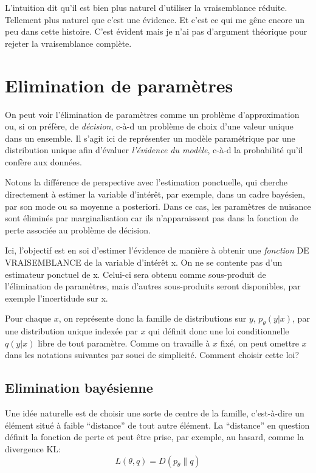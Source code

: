 \documentclass{article}
\begin{document}
L'intuition dit qu'il est bien plus naturel d'utiliser la vraisemblance r\'eduite. Tellement plus naturel que c'est une \'evidence. Et c'est ce qui me g\^ene encore un peu dans cette histoire. C'est \'evident mais je n'ai pas d'argument th\'eorique pour rejeter la vraisemblance compl\`ete. 


\section{Elimination de param\`etres}

On peut voir l'\'elimination de param\`etres comme un probl\`eme d'approximation ou, si on pr\'ef\`ere, de {\em d\'ecision}, c-\`a-d un probl\`eme de choix d'une valeur unique dans un ensemble. Il s'agit ici de repr\'esenter un mod\`ele param\'etrique par une distribution unique afin d'\'evaluer {\em l'\'evidence du mod\`ele}, c-\`a-d la probabilit\'e qu'il conf\`ere aux donn\'ees. 

Notons la diff\'erence de perspective avec l'estimation ponctuelle, qui cherche directement \`a estimer la variable d'int\'er\^et, par exemple, dans un cadre bay\'esien, par son mode ou sa moyenne a posteriori. Dans ce cas, les param\`etres de nuisance sont \'elimin\'es par marginalisation car ils n'apparaissent pas dans la fonction de perte associ\'ee au probl\`eme de d\'ecision. 

Ici, l'objectif est en soi d'estimer l'\'evidence de mani\`ere \`a obtenir une {\em fonction} DE VRAISEMBLANCE de la variable d'int\'er\^et x. On ne se contente pas d'un estimateur ponctuel de x. Celui-ci sera obtenu comme sous-produit de l'\'elimination de param\`etres, mais d'autres sous-produits seront disponibles, par exemple l'incertidude sur x. 

Pour chaque $x$, on repr\'esente donc la famille de distributions sur $y$, $p_\theta(y|x)$, par une distribution unique index\'ee par $x$ qui d\'efinit donc une loi conditionnelle $q(y|x)$ libre de tout param\`etre. Comme on travaille \`a $x$ fix\'e, on peut omettre $x$ dans les notations suivantes par souci de simplicit\'e. Comment choisir cette loi?


\subsection{Elimination bay\'esienne}

Une id\'ee naturelle est de choisir une sorte de centre de la famille, c'est-\`a-dire un \'el\'ement situ\'e \`a faible ``distance'' de tout autre \'el\'ement. La ``distance'' en question d\'efinit la fonction de perte et peut \^etre prise, par exemple, au hasard, comme la divergence KL: 
$$L(\theta, q) = D(p_\theta\|q)$$
\end{document}
